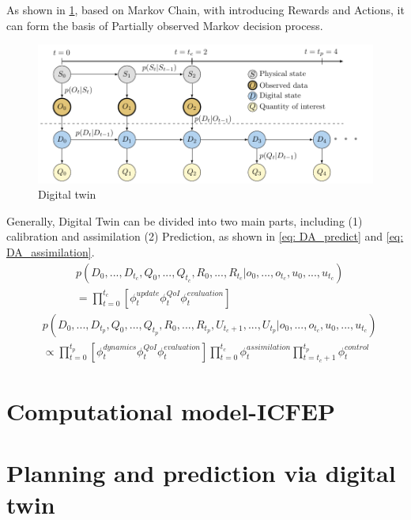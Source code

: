 As shown in \cref{fig: POMDP}, based on Markov Chain, with introducing Rewards and Actions, it can form the basis of Partially observed Markov decision process.
\begin{figure}[H]
    \centering
    \includegraphics[width = 140mm]{Figures/figure-POMDP.pdf}
    \caption{Digital twin}
    \label{fig: POMDP}
\end{figure}
Generally, Digital Twin can be divided into two main parts, including (1) calibration and assimilation (2) Prediction, as shown in \cref{eq: DA_predict}  and \cref{eq: DA_assimilation}.
\begin{equation}
\begin{aligned}
& p(D_{0},...,D_{t_{c}},Q_{0},...,Q_{t_{c}},R_{0},...,R_{t_{c}}|o_{0},...,o_{t_{c}},u_{0},...,u_{t_{c}}) \\
& = \prod_{t=0}^{t_{c}}[\phi_{t}^{update}\phi_{t}^{QoI}\phi_{t}^{evaluation}] \label{eq: DA_predict}
\end{aligned}
\end{equation}
\begin{equation}
\begin{aligned}
    & p(D_{0},...,D_{t_{p}},Q_{0},...,Q_{t_{p}},R_{0},...,R_{t_{p}},U_{t_{c}+1},...,U_{t_{p}}|o_{0},...,o_{t_{c}},u_{0},...,u_{t_{c}}) \\
    & \propto \prod_{t=0}^{t_{p}}[\phi_{t}^{dynamics}\phi_{t}^{QoI}\phi_{t}^{evaluation}] \prod_{t=0}^{t_{c}}\phi_{t}^{assimilation} \prod_{t=t_{c}+1}^{t_{p}}\phi_{t}^{control} \label{eq: DA_assimilation}
\end{aligned}
\end{equation}
\section{Computational model-ICFEP}

\section{Planning and prediction via digital twin}